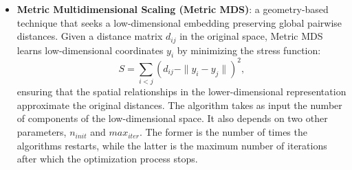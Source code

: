 \documentclass[prl,twocolumn]{revtex4-1}
\begin{document}
\begin{itemize}[leftmargin=0pt, itemsep=0pt]
    The embedding is obtained by minimizing the Kullback--Leibler divergence between the high-dimensional and low-dimensional similarity distributions:
    \begin{equation}
        C = \sum_{i \neq j} p_{ij}\log\frac{p_{ij}}{q_{ij}},
    \end{equation}
    which is optimized through gradient descent.
    As a result, points that are close in the original space tend to remain close in the low-dimensional representation, while dissimilar points are mapped farther apart.

    \item[] \textbf{Metric Multidimensional Scaling (Metric MDS)}:
    a geometry-based technique that seeks a low-dimensional embedding preserving global pairwise distances.
    Given a distance matrix $d_{ij}$ in the original space, Metric MDS learns low-dimensional coordinates $y_i$ by minimizing the stress function:
    \begin{equation}
        S = \sum_{i<j} \left( d_{ij} - \|y_i - y_j\| \right)^2,
    \end{equation}
    ensuring that the spatial relationships in the lower-dimensional representation approximate the original distances. The algorithm takes as input the number of components of the low-dimensional space. It also depends on two other parameters, $n_{init}$ and $max_{iter}$. The former is the number of times the algorithms restarts, while the latter is the maximum number of iterations after which the optimization process stops.

    
\end{itemize}


\vspace{-1.5em}
\end{document}
